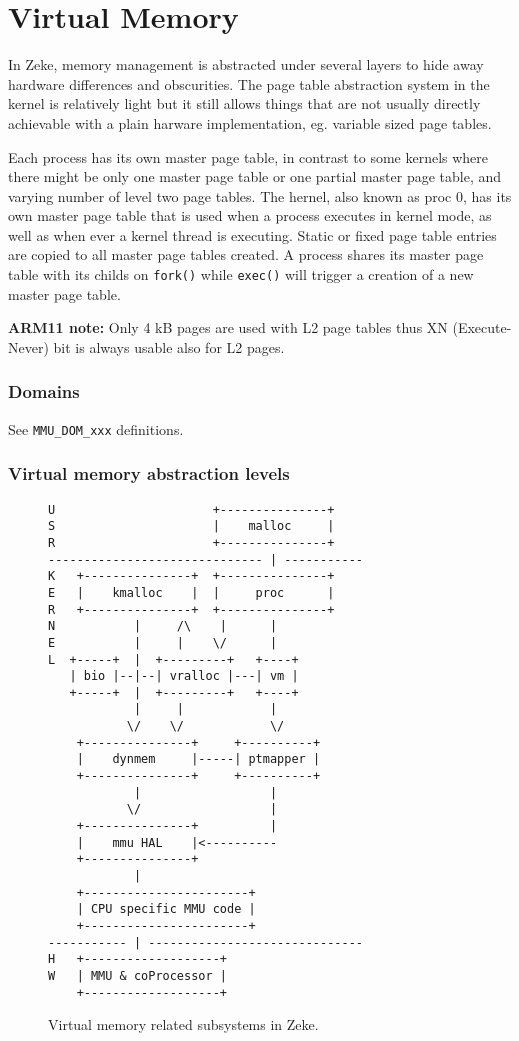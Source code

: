 \chapter{Virtual Memory}

In Zeke, memory management is abstracted under several layers to hide away
hardware differences and obscurities. The page table abstraction system in
the kernel is relatively light but it still allows things that are not usually
directly achievable with a plain harware implementation, eg. variable sized
page tables.

Each process has its own master page table, in contrast to some kernels where
there might be only one master page table or one partial master page table,
and varying number of level two page tables. The hernel, also known as proc 0,
has its own master page table that is used when a process executes in kernel
mode, as well as when ever a kernel thread is executing. Static or fixed
page table entries are copied to all master page tables created.
A process shares its master page table with its childs on \verb+fork()+ while
\verb+exec()+ will trigger a creation of a new master page table.

\textbf{ARM11 note:} Only 4 kB pages are used with L2 page tables thus
XN (Execute-Never) bit is always usable also for L2 pages.

\subsection{Domains}

See \verb+MMU_DOM_xxx+ definitions.

\subsection{Virtual memory abstraction levels}

\begin{figure}
\begin{verbatim}
U                      +---------------+
S                      |    malloc     |
R                      +---------------+
------------------------------ | -----------
K   +---------------+  +---------------+
E   |    kmalloc    |  |     proc      |
R   +---------------+  +---------------+
N           |     /\    |      |
E           |     |    \/      |
L  +-----+  |  +---------+   +----+
   | bio |--|--| vralloc |---| vm |
   +-----+  |  +---------+   +----+
            |     |            |
           \/    \/            \/
    +---------------+     +----------+
    |    dynmem     |-----| ptmapper |
    +---------------+     +----------+
            |                  |
           \/                  |
    +---------------+          |
    |    mmu HAL    |<----------
    +---------------+
            |
    +-----------------------+
    | CPU specific MMU code |
    +-----------------------+
----------- | ------------------------------
H   +-------------------+
W   | MMU & coProcessor |
    +-------------------+
\end{verbatim}
\caption{Virtual memory related subsystems in Zeke.}
\label{figure:vmsubsys}
\end{figure}

